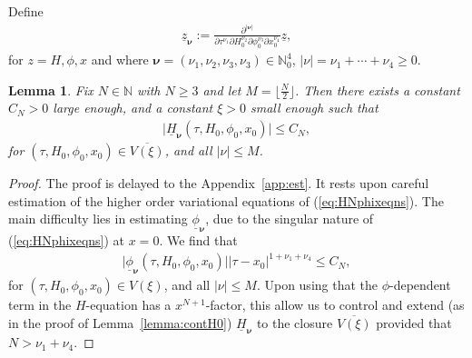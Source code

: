 \documentclass[reqno,12pt]{amsart}
\newcommand{\eqlab}[1]{\label{eq:#1}}
\renewcommand{\eqref}[1]{(\ref{eq:#1})}
\newcommand{\lemmaref}[1]{Lemma~\ref{lemma:#1}}
\newcommand{\lemmalab}[1]{\label{lemma:#1}}
\newcommand{\appref}[1]{Appendix~\ref{app:#1}}
\newtheorem{lemma}[theorem]{Lemma}
\numberwithin{equation}{section}
\begin{document}
Define
 \begin{align}\eqlab{znu}
  \underline z_{\mathbf \nu} := \frac{\partial^{\vert \mathbf \nu\vert} }{\partial \tau^{\nu_{1}} \partial H_0^{\nu_2}\partial \phi_0^{\nu_3} \partial x_0^{\nu_4} } \underline z,
 \end{align}
for $z=H,\phi,x$ and where $\mathbf \nu=(\nu_1,\nu_2,\nu_3,\nu_3)\in \mathbb N_0^4$, $\vert \nu\vert=\nu_1+\cdots +\nu_4\ge 0$. 
\begin{lemma}\lemmalab{est0}
Fix $N\in \mathbb N$ with $N\ge 3$ and let $M=\lfloor \frac{N}{2}\rfloor$. Then there exists a constant $C_N>0$ large enough, and a constant $\xi>0$ small enough such that 
\begin{align*}
 \vert \underline H_{\mathbf \nu} (\tau,H_0,\phi_0,x_0)\vert \le C_N,
\end{align*}
for $(\tau,H_0,\phi_0,x_0)\in \overline{ V(\xi)}$,
and all $\vert \nu\vert\le M$.
\end{lemma}
\begin{proof}
The proof is delayed to the \appref{est}. It rests upon careful estimation of the higher order variational equations of \eqref{HNphixeqns}. The main difficulty lies in estimating $\underline \phi_{\mathbf \nu}$, due to the singular nature of \eqref{HNphixeqns} at $x=0$. We find that 
 \begin{align*}
  \vert \underline \phi_{\mathbf \nu} (\tau,H_0,\phi_0,x_0)\vert \vert \tau-x_0\vert^{1+\nu_1+\nu_4} \le C_N,
 \end{align*}
 for $(\tau,H_0,\phi_0,x_0)\in  V(\xi)$,
and all $\vert \nu\vert\le M$. Upon using that the $\phi$-dependent term in the $H$-equation has a $x^{N+1}$-factor, this allow us to control and extend (as in the proof of \lemmaref{contH0}) $\underline H_{\mathbf \nu}$ to the closure $\overline{V(\xi)}$ provided that $N> \nu_1+\nu_4$.
 
\end{proof}



\end{document}
